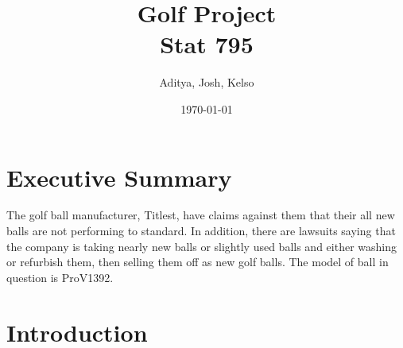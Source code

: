 \documentclass{article}\usepackage[]{graphicx}\usepackage[]{color}
\title{Golf Project \\
\large Stat 795}
\author{Aditya, Josh, Kelso}
\date{\today}
\makeatletter
\newenvironment{kframe}{%
 \def\at@end@of@kframe{}%
 \ifinner\ifhmode%
  \def\at@end@of@kframe{\end{minipage}}%
  \begin{minipage}{\columnwidth}%
 \fi\fi%
 \def\FrameCommand##1{\hskip\@totalleftmargin \hskip-\fboxsep
 \colorbox{shadecolor}{##1}\hskip-\fboxsep
     \hskip-\linewidth \hskip-\@totalleftmargin \hskip\columnwidth}%
 \MakeFramed {\advance\hsize-\width
   \@totalleftmargin\z@ \linewidth\hsize
   \@setminipage}}%
 {\par\unskip\endMakeFramed%
 \at@end@of@kframe}
\newenvironment{knitrout}{}{} %
\newcommand{\doublespacing}{\let\CS=\@currsize\renewcommand{
		\baselinestretch}{1.2}\small\CS}
\makeatother
\begin{document}
 
\maketitle



\begin{knitrout}
\color{fgcolor}\begin{kframe}


{\ttfamily\noindent\bfseries\color{errorcolor}{\#\# Error in library(RCurl): there is no package called 'RCurl'}}

{\ttfamily\noindent\bfseries{}}

{\ttfamily\noindent\bfseries{}}\end{kframe}
\end{knitrout}
\doublespacing


\section*{Executive Summary}


The golf ball manufacturer, Titlest, have claims against them that their all new balls are not performing to standard. In addition, there are lawsuits saying that the company is taking nearly new balls or slightly used balls and either washing or refurbish them, then selling them off as new golf balls. The model of ball in question is ProV1392. 

\section*{Introduction}
\end{document}

